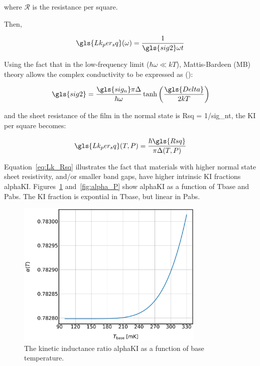 where $\mathcal{R}$ is the resistance per square.

Then,

\begin{equation}
  \gls{Lk_per_sq}(\omega) = \frac{1}{\gls{sig2}\omega t}
\end{equation}

Using the fact that in the low-frequency limit ($\hbar\omega \ll kT$), Mattis-Bardeen (MB) theory allows the complex conductivity to be expressed as (\citet{mauskopf2018transition,annunziata2010tunable}):

\begin{equation}
  \gls{sig2} = \frac{\gls{sig_n}\pi\Delta}{\hbar\omega}\tanh \left(\frac{\gls{Delta}}{2kT}\right)
\end{equation}

and the sheet resistance of the film in the normal state is \gls{Rsq} = 1/\gls{sig_n}t, the KI per square becomes:

\begin{equation} \label{eq:Lk_Rsq}
  \gls{Lk_per_sq}(T,P) = \frac{\hbar\gls{Rsq}}{\pi\Delta(T,P)}
\end{equation}

Equation~\ref{eq:Lk_Rsq} illustrates the fact that materials with higher normal state sheet resistivity, and/or smaller band gaps, have higher intrinsic KI fractions \gls{alphaKI}. Figures~\ref{fig:alpha_T} and~\ref{fig:alpha_P} show \gls{alphaKI} as a function of \gls{Tbase} and \gls{Pabs}. The KI fraction is expontial in \gls{Tbase}, but linear in \gls{Pabs}.

\begin{figure}[!htbp]
\centering
\includegraphics[width=0.8\textwidth]{figures/kid_model/alpha_T}
\caption[~ as a function of base temperature.]{The kinetic inductance ratio \gls{alphaKI} as a function of base temperature.}
\label{fig:alpha_T}
\end{figure}

